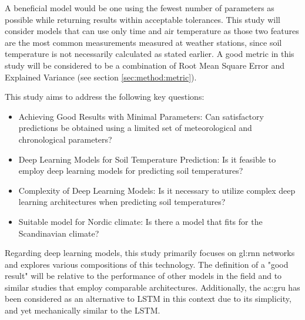A beneficial model would be one using the fewest number of parameters as possible while returning results within acceptable tolerances. This study will consider models that can use only time and air temperature as those two features are the most common measurements measured at weather stations, since soil temperature is not necessarily calculated as stated earlier. A good metric in this study will be considered to be a combination of Root Mean Square Error and Explained Variance (see section \ref{sec:method:metric}). 

This study aims to address the following key questions:
\begin{itemize}
	\item Achieving Good Results with Minimal Parameters: Can satisfactory predictions be obtained using a limited set of meteorological and chronological parameters?
	
	\item Deep Learning Models for Soil Temperature Prediction: Is it feasible to employ deep learning models for predicting soil temperatures?
	
	\item Complexity of Deep Learning Models: Is it necessary to utilize complex deep learning architectures when predicting soil temperatures?
	
	\item Suitable model for Nordic climate: Is there a model that fits for the Scandinavian climate?
\end{itemize}

Regarding deep learning models, this study primarily focuses on \gls{gl:rnn} networks and explores various compositions of this technology. The definition of a "good result" will be relative to the performance of other models in the field and to similar studies that employ comparable architectures. Additionally, the \acrfull{ac:gru} has been considered as an alternative to LSTM in this context due to its simplicity, and yet mechanically similar to the LSTM.
